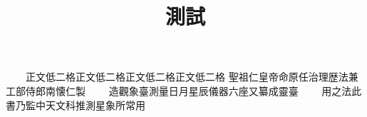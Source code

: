 \documentclass[四库全书]{ltc-guji}
\title{測試}
\begin{document}
\begin{正文}
　　正文低二格正文低二格正文低二格正文低二格
聖祖仁皇帝命原任治理歴法兼工部侍郎南懐仁製
　　造觀象臺測量日月星辰儀器六座又纂成靈臺
　　用之法此書乃監中天文科推測星象所常用
\end{正文}
\end{document}
